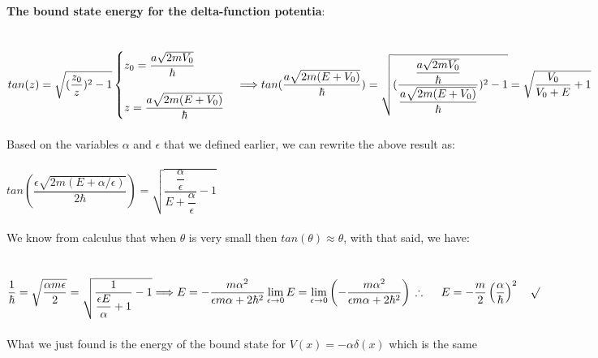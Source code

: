\documentclass[fleqn]{article}
\begin{document}
{      \textbf{The bound state energy for the delta-function potentia}: \\
      \\
      \\
      $
        tan(z)=\sqrt{(\dfrac{z_0}{z})^2-1} \\ \\
        \begin{cases}
          z_0=\dfrac{a \sqrt{2mV_0}}{\hbar} \\
          \\
          z=\dfrac{a\sqrt{2m(E+V_0)}}{\hbar}
        \end{cases}
        \Longrightarrow tan(\dfrac{a\sqrt{2m(E+V_0)}}{\hbar})=\sqrt{(\dfrac{\dfrac{a \sqrt{2mV_0}}{\hbar}}{\dfrac{a\sqrt{2m(E+V_0)}}{\hbar}})^2-1}
        =\sqrt{\dfrac{V_0}{V_0+E}+1}
      $
      \\
      \\
      Based on the variables $\alpha$ and $\epsilon$ that we defined earlier, we can rewrite the above result as: 
      \\
      \\
      $
        tan\left(\dfrac{\epsilon \sqrt{2m(E+\alpha/\epsilon)}}{2\hbar}\right)=\sqrt{\dfrac{\dfrac{\alpha}{\epsilon}}{E+\dfrac{\alpha}{\epsilon}}-1}
      $
      \\
      \\
      We know from calculus that when $\theta$ is very small then $tan(\theta) \approx \theta$, with that said,
      we have: \\
      \\
      \\
      $
        \dfrac{1}{\hbar}=\sqrt{\dfrac{\alpha m \epsilon}{2}}=\sqrt{\dfrac{1}{\dfrac{\epsilon E}{\alpha}+1}-1} \Longrightarrow 
        E=-\dfrac{m \alpha^2}{\epsilon m \alpha+2\hbar^2} \\
        \\
        \\
        \lim\limits_{\epsilon \to 0} E=\lim\limits_{\epsilon \to 0} \left(-\dfrac{m \alpha^2}{\epsilon m \alpha+2\hbar^2} \right) \\
        \\
        \\
        \\
        \therefore ~~~~ E=-\dfrac{m}{2} \left(\dfrac{\alpha}{\hbar}\right)^2 ~~~ \surd
      $
      \\
      \\
      What we just found is the energy of the bound state for $V(x)=-\alpha \delta(x)$ which is the same 
}
\end{document}

